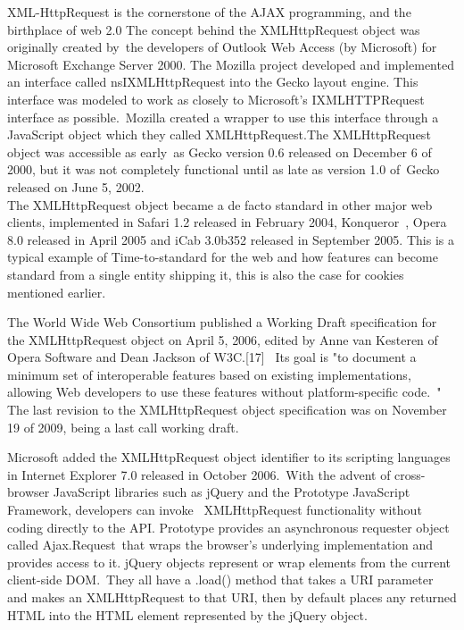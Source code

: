 XML-HttpRequest is the cornerstone of the AJAX programming, and the birthplace of web 2.0 The concept behind the XMLHttpRequest object was originally created by\
the developers of Outlook Web Access (by Microsoft) for Microsoft Exchange Server 2000.
The Mozilla project developed and implemented an interface called nsIXMLHttpRequest into the Gecko layout engine.
This interface was modeled to work as closely to Microsoft's IXMLHTTPRequest interface as possible.\
Mozilla created a wrapper to use this interface through a JavaScript object which they called XMLHttpRequest.The XMLHttpRequest object was accessible as early\
as Gecko version 0.6 released on December 6 of 2000, but it was not completely functional until as late as version 1.0 of\
Gecko released on June 5, 2002. \\
The XMLHttpRequest object became a de facto standard in other major web clients, implemented in Safari 1.2 released in February 2004, Konqueror\
, Opera 8.0 released in April 2005 and iCab 3.0b352 released in September 2005. This is a typical example of Time-to-standard for the web and how features can become standard from a
single entity shipping it, this is also the case for cookies mentioned earlier.\

The World Wide Web Consortium published a Working Draft specification for the XMLHttpRequest object on April 5, 2006, 
edited by Anne van Kesteren of Opera Software and Dean Jackson of W3C.[17] \
Its goal is "to document a minimum set of interoperable features based on existing implementations, allowing Web developers to use these features without platform-specific code.\
" The last revision to the XMLHttpRequest object specification was on November 19 of 2009, being a last call working draft.\

Microsoft added the XMLHttpRequest object identifier to its scripting languages in Internet Explorer 7.0 released in October 2006.\
With the advent of cross-browser JavaScript libraries such as jQuery and the Prototype JavaScript Framework, developers can invoke \
XMLHttpRequest functionality without coding directly to the API. Prototype provides an asynchronous requester object called Ajax.Request\
that wraps the browser's underlying implementation and provides access to it. jQuery objects represent or wrap elements from the current client-side DOM.\
They all have a .load() method that takes a URI parameter and makes an XMLHttpRequest to that URI, then by default places any returned HTML into the HTML element represented by the jQuery object.\


